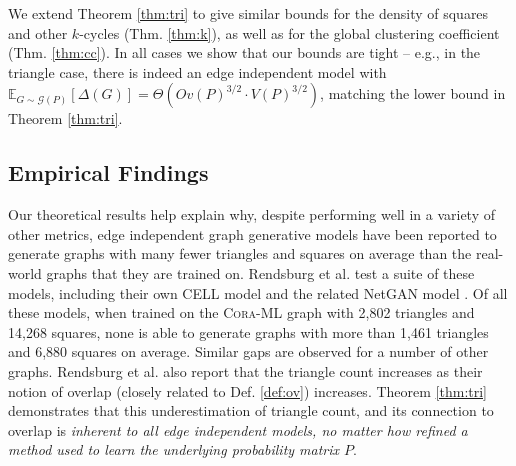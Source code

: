 \documentclass{article}
\newcommand{\norm}[1]{\|#1\|}
\newcommand{\E}{\mathbb{E}}
\begin{document}

We extend Theorem \ref{thm:tri} to give similar bounds for the density of squares and other $k$-cycles (Thm. \ref{thm:k}), as well as for the global clustering coefficient (Thm. \ref{thm:cc}). In all cases we show that our bounds are tight -- e.g., in the triangle case, %
 there is indeed an edge independent model with %
 $\E_{G \sim \mathcal{G}(P)} \left [\Delta(G) \right ] = \Theta \left (Ov(P)^{3/2} \cdot V(P)^{3/2} \right )$, matching the lower bound in Theorem \ref{thm:tri}. 
 


\subsection{Empirical Findings}

Our theoretical results help explain why, despite performing well in a variety of other metrics, edge independent graph generative models have been reported to generate graphs with many fewer triangles and squares on average than the real-world graphs that they are trained on. Rendsburg et al. \cite{rendsburgnetgan} test a suite of these models, including their own CELL model and the related NetGAN model \cite{bojchevski2018netgan}. Of all these models, when trained on the \textsc{Cora-ML} graph with 2,802 triangles and 14,268 squares, none is able to generate graphs with more than 1,461 triangles and 6,880 squares on average. Similar gaps are observed for a number of other graphs.
 Rendsburg et al. also report that the triangle count increases as their notion of overlap (closely related to Def. \ref{def:ov}) increases. Theorem \ref{thm:tri} demonstrates that this underestimation of triangle count, and its connection to overlap is \emph{inherent to all edge independent models, no matter how refined a method used to learn the underlying probability matrix $P$}. 
 
\end{document}
